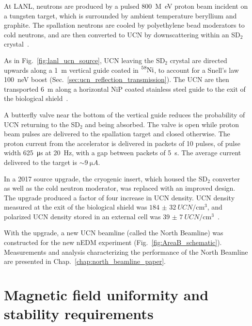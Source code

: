At LANL, neutrons are produced by a pulsed \qty{800}{M\eV} proton beam incident on a tungsten target, which is surrounded by ambient temperature beryllium and graphite. The spallation neutrons are cooled by polyethylene bead moderators to cold neutrons, and are then converted to UCN by downscattering within an SD$_2$ crystal~\cite{saunders_performance_2013}.

As in Fig.~\ref{fig:lanl_ucn_source}, UCN leaving the SD$_2$ crystal are directed upwards along a \qty{1}{\meter} vertical guide coated in $\ce{^{58}Ni}$, to account for a Snell's law \qty{100}{\nano\eV} boost (Sec.~\ref{sec:ucn_reflection_transmission}). The UCN are then transported \qty{6}{\meter} along a horizontal NiP coated stainless steel guide to the exit of the biological shield~\cite{ito_performance_2018}.

A butterfly valve near the bottom of the vertical guide reduces the probability of UCN returning to the SD$_2$ and being absorbed. The valve is open while proton beam pulses are delivered to the spallation target and closed otherwise. The proton current from the accelerator is delivered in packets of 10 pulses, of pulse width \qty{625}{\micro\s} at \qty{20}{\hertz}, with a gap between packets of \qty{5}{\s}. The average current delivered to the target is $\sim\qty{9}{\micro A}$.

In a 2017 source upgrade, the cryogenic insert, which housed the SD$_2$ converter as well as the cold neutron moderator, was replaced with an improved design. The upgrade produced a factor of four increase in UCN density. UCN density measured at the exit of the biological shield was $\qty{184(32)}{UCN\per \cm^3}$, and polarized UCN density stored in an external cell was $\qty{39(7)}{UCN\per \cm^3}$~\cite{ito_performance_2018}.

With the upgrade, a new UCN beamline (called the North Beamline) was constructed for the new nEDM experiment (Fig.~\ref{fig:AreaB_schematic}). Measurements and analysis characterizing the performance of the North Beamline are presented in Chap.~\ref{chap:north_beamline_paper}.



\section
{
    Magnetic field uniformity and stability requirements\label{sec:magnetic_field_req}
}


